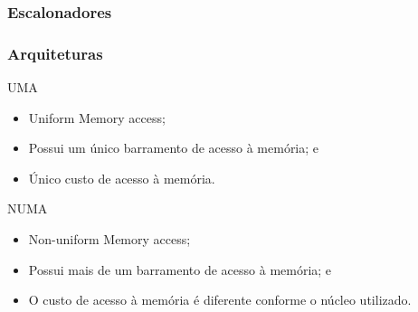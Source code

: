 \documentclass[10pt, pdf,xcolor=pdftex,dvipsnames,table]{beamer}
\begin{document}
\begin{frame} \frametitle{Escalonadores}
\begin{table}[]
    \footnotesize
    \caption{Comparativo entre os escalonadores apresentados}
    \label{tab:compare_ltms}
   \end{table}
\end{frame}

\begin{frame} \frametitle{Arquiteturas}
\begin{block}{UMA}
\begin{itemize}
	\item Uniform Memory access;
	\item Possui um único barramento de acesso à memória; e
	\item Único custo de acesso à memória.
\end{itemize}
\end{block}
\begin{block}{NUMA}
\begin{itemize}
	\item Non-uniform Memory access;
	\item Possui mais de um barramento de acesso à memória; e
	\item O custo de acesso à memória é diferente conforme o núcleo utilizado.
\end{itemize}
\end{block}
\end{frame}
\end{document}
